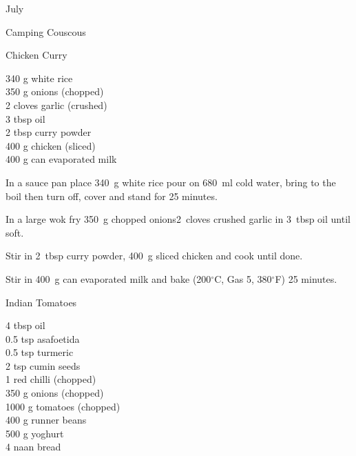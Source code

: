 \begin{menu}{July}
\begin{recipe}{1}{Camping Couscous}
\begin{instructions}
    \end{instructions}
    \end{recipe}%
  
    \begin{recipe}{2}{Chicken Curry}%
		\begin{ingredients}
		340 g white rice  \\
	350 g onions (chopped) \\
	2 cloves garlic (crushed) \\
	3 tbsp oil  \\
	2 tbsp curry powder  \\
	400 g chicken (sliced) \\
	400 g can evaporated milk  \\
	
		\end{ingredients}
	
	
	
    \begin{instructions}
    \item 
    In a
    sauce pan
    place
    340~g  white rice
    pour on
    680~ml  cold water,
    bring to the boil then turn off, cover and stand for 25 minutes.
  \item 
        In a large wok fry
        350~g chopped onions2~cloves crushed garlic
        in
        3~tbsp  oil
        until soft.
      \item 
        Stir in
        2~tbsp  curry powder,
        400~g sliced chicken
        and cook until done.
      \item 
        Stir in
        400~g  can evaporated milk
        and
        bake (200$^{\circ}$C, Gas 5, 380$^{\circ}$F) 25 minutes.
      
    \end{instructions}
    \end{recipe}%
  
    \begin{recipe}{2}{Indian Tomatoes}%
		\begin{ingredients}
		4 tbsp oil  \\
	0.5 tsp asafoetida  \\
	0.5 tsp turmeric  \\
	2 tsp cumin seeds  \\
	1  red chilli (chopped) \\
	350 g onions (chopped) \\
	1000 g tomatoes (chopped) \\
	400 g runner beans  \\
	500 g yoghurt  \\
	4  naan bread  \\
	

\end{ingredients}
\end{recipe}
\end{menu}
